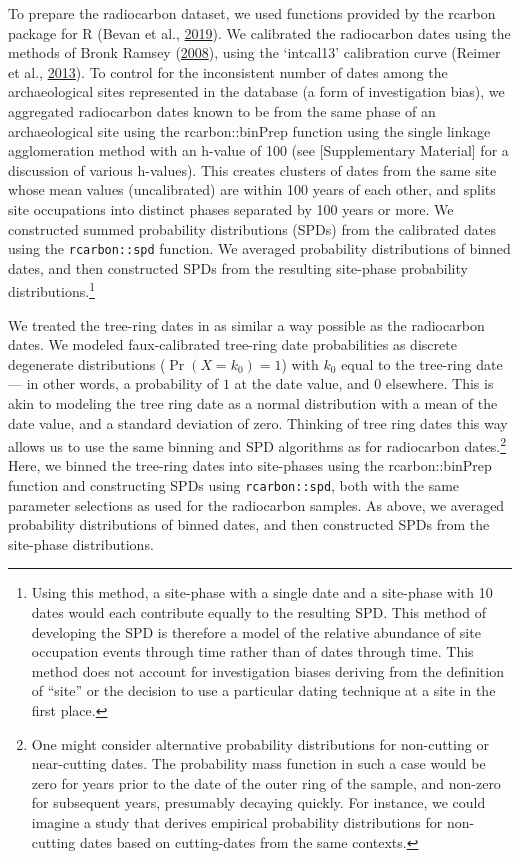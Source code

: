 \documentclass[
]{article}
\begin{document}
To prepare the radiocarbon dataset, we used functions provided by the rcarbon package for R (Bevan et al., \protect\hyperlink{ref-Bevan2019}{2019}). We calibrated the radiocarbon dates using the methods of Bronk Ramsey (\protect\hyperlink{ref-Bronk2008}{2008}), using the `intcal13' calibration curve (Reimer et al., \protect\hyperlink{ref-Reimer2013}{2013}). To control for the inconsistent number of dates among the archaeological sites represented in the database (a form of investigation bias), we aggregated radiocarbon dates known to be from the same phase of an archaeological site using the rcarbon::binPrep function using the single linkage agglomeration method with an h-value of 100 (see {[}Supplementary Material{]} for a discussion of various h-values). This creates clusters of dates from the same site whose mean values (uncalibrated) are within 100 years of each other, and splits site occupations into distinct phases separated by 100 years or more. We constructed summed probability distributions (SPDs) from the calibrated dates using the \texttt{rcarbon::spd} function. We averaged probability distributions of binned dates, and then constructed SPDs from the resulting site-phase probability distributions.\footnote{Using this method, a site-phase with a single date and a site-phase with 10 dates would each contribute equally to the resulting SPD. This method of developing the SPD is therefore a model of the relative abundance of site occupation events through time rather than of dates through time. This method does not account for investigation biases deriving from the definition of ``site'' or the decision to use a particular dating technique at a site in the first place.}

We treated the tree-ring dates in as similar a way possible as the radiocarbon dates. We modeled faux-calibrated tree-ring date probabilities as discrete degenerate distributions (\(\Pr(X=k_0)=1\)) with \(k_0\) equal to the tree-ring date --- in other words, a probability of \(1\) at the date value, and \(0\) elsewhere. This is akin to modeling the tree ring date as a normal distribution with a mean of the date value, and a standard deviation of zero. Thinking of tree ring dates this way allows us to use the same binning and SPD algorithms as for radiocarbon dates.\footnote{One might consider alternative probability distributions for non-cutting or near-cutting dates. The probability mass function in such a case would be zero for years prior to the date of the outer ring of the sample, and non-zero for subsequent years, presumably decaying quickly. For instance, we could imagine a study that derives empirical probability distributions for non-cutting dates based on cutting-dates from the same contexts.} Here, we binned the tree-ring dates into site-phases using the rcarbon::binPrep function and constructing SPDs using \texttt{rcarbon::spd}, both with the same parameter selections as used for the radiocarbon samples. As above, we averaged probability distributions of binned dates, and then constructed SPDs from the site-phase distributions.
\end{document}
